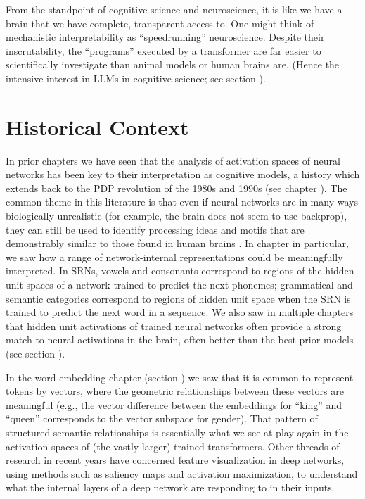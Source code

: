 From the standpoint of cognitive science and neuroscience, it is like we have a
brain that we have complete, transparent access to. One might think of
mechanistic interpretability as ``speedrunning'' neuroscience. Despite their
inscrutability, the ``programs'' executed by a transformer are far easier to
scientifically investigate than animal models or human brains are. (Hence the
intensive interest in LLMs in cognitive science; see section
).


\section{Historical Context}\label{mechInterpHist}

In prior chapters we have seen that the analysis of activation spaces of neural
networks has been key to their interpretation as cognitive models, a history
which extends back to the PDP revolution of the 1980s and 1990s (see chapter
). The common theme in this literature is that even if
neural networks are in many ways biologically unrealistic (for example, the
brain does not seem to use backprop), they can still be used to identify
processing ideas and motifs that are demonstrably similar to those found in
human brains \cite{zipser1992identification}. In chapter
 in particular, we saw how a range of
network-internal representations could be meaningfully interpreted. In SRNs,
vowels and consonants correspond to regions of the hidden unit spaces of a
network trained to predict the next phonemes; grammatical and semantic
categories correspond to regions of hidden unit space when the SRN is trained
to predict the next word in a sequence. We also saw in multiple chapters that
hidden unit activations of trained neural networks often provide a strong match
to neural activations in the brain, often better than the best prior models
(see section ).

In the word embedding chapter (section ) we saw
that it is common to represent tokens by vectors, where the geometric
relationships between these vectors are meaningful (e.g., the vector difference
between the embeddings for ``king'' and ``queen'' corresponds to the vector
subspace for gender). That pattern of structured semantic relationships is
essentially what we see at play again in the activation spaces of (the vastly
larger) trained transformers. Other threads of research in recent years have
concerned feature visualization in deep networks, using methods such as
saliency maps and activation maximization, to understand what the internal
layers of a deep network are responding to in their inputs.

